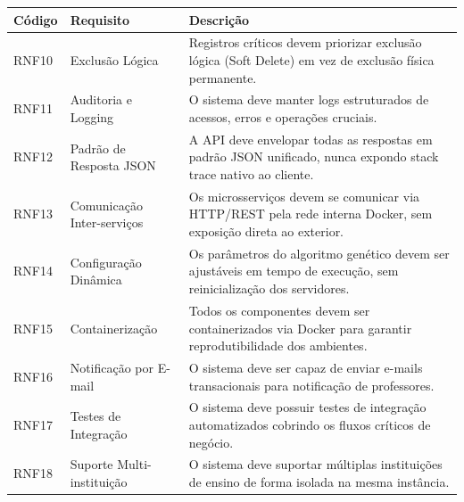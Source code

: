 \newpage
\begin{longtable}{|C{1.8cm}|L{4.5cm}|L{7.1cm}|}
\hline
\textbf{Código} & \textbf{Requisito} & \textbf{Descrição} \\
\hline
\endhead
RNF10 & Exclusão Lógica & Registros críticos devem priorizar exclusão lógica (Soft Delete) em vez de exclusão física permanente. \\
\hline
RNF11 & Auditoria e Logging & O sistema deve manter logs estruturados de acessos, erros e operações cruciais. \\
\hline
RNF12 & Padrão de Resposta JSON & A API deve envelopar todas as respostas em padrão JSON unificado, nunca expondo stack trace nativo ao cliente. \\
\hline
RNF13 & Comunicação Inter-serviços & Os microsserviços devem se comunicar via HTTP/REST pela rede interna Docker, sem exposição direta ao exterior. \\
\hline
RNF14 & Configuração Dinâmica & Os parâmetros do algoritmo genético devem ser ajustáveis em tempo de execução, sem reinicialização dos servidores. \\
\hline
RNF15 & Containerização & Todos os componentes devem ser containerizados via Docker para garantir reprodutibilidade dos ambientes. \\
\hline
RNF16 & Notificação por E-mail & O sistema deve ser capaz de enviar e-mails transacionais para notificação de professores. \\
\hline
RNF17 & Testes de Integração & O sistema deve possuir testes de integração automatizados cobrindo os fluxos críticos de negócio. \\
\hline
RNF18 & Suporte Multi-instituição & O sistema deve suportar múltiplas instituições de ensino de forma isolada na mesma instância. \\
\hline
\end{longtable}

\fonteautores
\setcounter{table}{0}
